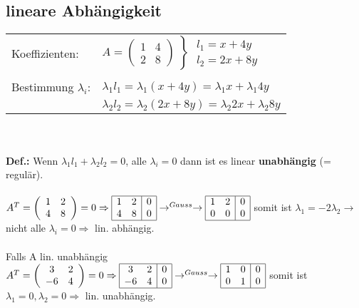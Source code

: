 \subsection{lineare Abhängigkeit}
	\begin{tabular}{ll}
		Koeffizienten: & $A = \left(\begin{array}{cc} 1 & 4\\ 2 & 8 \end{array}\right) \left\rbrace\begin{array}{l} l_1 = x +4y \\ l_2 = 2x + 8y \end{array}\right.$\\ \\
		Bestimmung $\lambda_i$:  &  $\lambda_1 l_1 = \lambda_1 (x + 4y) = \lambda_1 x + \lambda_1 4y$ \\
		& $\lambda_2 l_2 = \lambda_2 (2x + 8y) = \lambda_2 2x + \lambda_2 8y$
	\end{tabular} \\ \\
	
	\textbf{Def.:} Wenn $\lambda_1 l_1 + \lambda_2 l_2 = 0$, alle $\lambda_i = 0$ dann ist es linear \textbf{unabhängig} (= regulär). \\ \\

	$A^T = \left(\begin{array}{cc}
		1 & 2 \\
		4 & 8
	\end{array}\right) =  0 \Rightarrow \begin{array}{|cc|c|}
		\hline 1 & 2 & 0\\
		4 & 8 & 0\\
		\hline
	\end{array} \rightarrow^{Gauss} \rightarrow \begin{array}{|cc|c|}
		\hline 1 & 2 & 0\\
		0 & 0 & 0\\
		\hline
	\end{array} $ \qquad somit ist $\lambda_1 = -2\lambda_2 \rightarrow$ nicht alle $\lambda_i = 0 \Rightarrow$ lin. abhängig.\\ \\

	Falls A lin. unabhängig\\
	$ A^T = \left(\begin{array}{cc}
		3 & 2\\
		-6 & 4\\
	\end{array}\right) = 0 \Rightarrow \begin{array}{|cc|c|}
		\hline 3 & 2 & 0\\
		-6 & 4 & 0 \\
		\hline
	\end{array} \rightarrow^{Gauss} \rightarrow \begin{array}{|cc|c|}
		\hline 1 & 0 & 0\\
		0 & 1 & 0\\
		\hline
	\end{array}$  \qquad somit ist $\lambda_1 = 0, \lambda_2 = 0 \Rightarrow$ lin. unabhängig.\\

